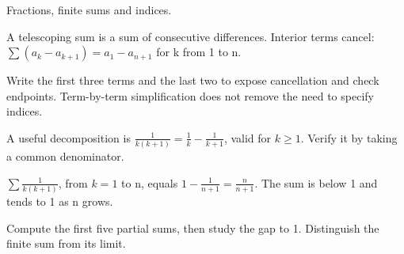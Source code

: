 \documentclass[11pt]{article}
\begin{document}
Fractions, finite sums and indices.\par
{}
A telescoping sum is a sum of consecutive differences. Interior terms cancel: \(\sum (a_{k}-a_{k+1})=a_{1}-a_{n+1}\) for k from 1 to n.\par
Write the first three terms and the last two to expose cancellation and check endpoints. Term-by-term simplification does not remove the need to specify indices.\par
A useful decomposition is \(\frac{1}{k(k+1)}=\frac{1}{k}-\frac{1}{k+1}\), valid for \(k\geq 1\). Verify it by taking a common denominator.\par
{}
\(\sum  \frac{1}{k(k+1)}\), from \(k=1\) to n, equals \(1-\frac{1}{n+1}=\frac{n}{n+1}\). The sum is below 1 and tends to 1 as n grows.\par
{}
Compute the first five partial sums, then study the gap to 1. Distinguish the finite sum from its limit.\par
\end{document}

